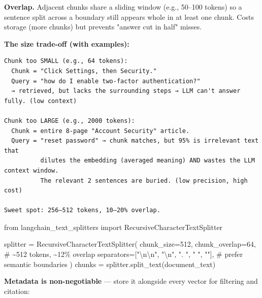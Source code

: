 \documentclass[11pt]{article}
\newenvironment{Shaded}{\begin{snugshade}}{\end{snugshade}}
\newcommand{\CharTok}[1]{\textcolor[rgb]{0.24,0.68,0.91}{#1}}
\newcommand{\CommentTok}[1]{\textcolor[rgb]{0.48,0.49,0.49}{#1}}
\newcommand{\DecValTok}[1]{\textcolor[rgb]{0.96,0.45,0.00}{#1}}
\newcommand{\ImportTok}[1]{\textcolor[rgb]{0.15,0.68,0.38}{#1}}
\newcommand{\NormalTok}[1]{\textcolor[rgb]{0.81,0.81,0.76}{#1}}
\newcommand{\OperatorTok}[1]{\textcolor[rgb]{0.81,0.81,0.76}{#1}}
\newcommand{\StringTok}[1]{\textcolor[rgb]{0.96,0.31,0.31}{#1}}
\begin{document}
\textbf{Overlap.} Adjacent chunks share a sliding window (e.g., 50--100 tokens) so a sentence split across a boundary still appears whole in at least one chunk. Costs storage (more chunks) but prevents "answer cut in half" misses.

\textbf{The size trade-off (with examples):}

\setcodelang{}

\begin{verbatim}
Chunk too SMALL (e.g., 64 tokens):
  Chunk = "Click Settings, then Security."
  Query = "how do I enable two-factor authentication?"
  → retrieved, but lacks the surrounding steps → LLM can't answer fully. (low context)

Chunk too LARGE (e.g., 2000 tokens):
  Chunk = entire 8-page "Account Security" article.
  Query = "reset password" → chunk matches, but 95% is irrelevant text that
          dilutes the embedding (averaged meaning) AND wastes the LLM context window.
          The relevant 2 sentences are buried. (low precision, high cost)

Sweet spot: 256–512 tokens, 10–20% overlap.
\end{verbatim}


\begin{Shaded}
\begin{Highlighting}[]
\ImportTok{from}\NormalTok{ langchain\_text\_splitters }\ImportTok{import}\NormalTok{ RecursiveCharacterTextSplitter}

\NormalTok{splitter }\OperatorTok{=}\NormalTok{ RecursiveCharacterTextSplitter(}
\NormalTok{    chunk\_size}\OperatorTok{=}\DecValTok{512}\NormalTok{, chunk\_overlap}\OperatorTok{=}\DecValTok{64}\NormalTok{,           }\CommentTok{\# \textasciitilde{}512 tokens, \textasciitilde{}12\% overlap}
\NormalTok{    separators}\OperatorTok{=}\NormalTok{[}\StringTok{"}\CharTok{\textbackslash{}n\textbackslash{}n}\StringTok{"}\NormalTok{, }\StringTok{"}\CharTok{\textbackslash{}n}\StringTok{"}\NormalTok{, }\StringTok{". "}\NormalTok{, }\StringTok{" "}\NormalTok{, }\StringTok{""}\NormalTok{],   }\CommentTok{\# prefer semantic boundaries}
\NormalTok{)}
\NormalTok{chunks }\OperatorTok{=}\NormalTok{ splitter.split\_text(document\_text)}
\end{Highlighting}
\end{Shaded}

\textbf{Metadata is non-negotiable} --- store it alongside every vector for filtering and citation:
\end{document}
